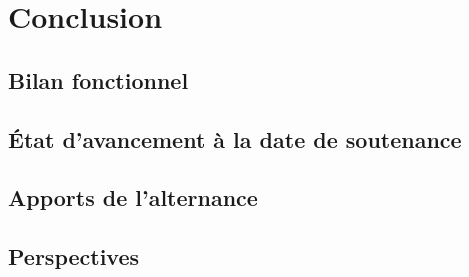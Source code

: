 \chapter{Conclusion}

\section{Bilan fonctionnel}

\section{État d'avancement à la date de soutenance}

\section{Apports de l'alternance}

\section{Perspectives}
